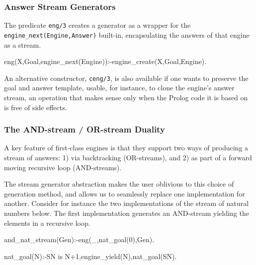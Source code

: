 \documentclass{new_tlp}
\begin{document}
\begin{comment}
As Prolog virtual machines, engines have  an internal state. Thus interacting with them requires a concise and expressive, but ultimately procedural API. This is not very different from what working with attributed variables, instrumental to adding constraint solvers, requires.
\end{comment}

\subsubsection{Answer Stream Generators}

The predicate {\tt eng/3} creates a generator as a wrapper for the {\tt
engine\_next(Engine,Answer)} built-in, encapsulating the answers of that engine
as a stream.
\begin{code}
eng(X,Goal,engine_next(Engine)):-engine_create(X,Goal,Engine). 
\end{code}
An alternative constructor, {\tt ceng/3}, is also available if one wants to preserve
the goal and answer template, usable, for instance, to clone
the engine's answer stream, an
operation that makes sense only when the Prolog code it is based on 
is free of side effects.

\subsubsection{The AND-stream / OR-stream Duality}

A key feature of first-class engines is that they support two ways of producing
a stream of answers: 1) via backtracking (OR-streams), and 2) as part of a
forward moving recursive loop (AND-streams).

The stream generator abstraction makes the user oblivious to this choice of
generation method, and allows us to seamlessly replace one implementation 
for another. Consider for instance the two implementations of the stream of natural
numbers below.
The first implementation generates an AND-stream yielding the elements in a
recursive loop.
\begin{code}
and_nat_stream(Gen):-eng(_,nat_goal(0),Gen).

nat_goal(N):-SN is N+1,engine_yield(N),nat_goal(SN).
\end{code}
\end{document}
